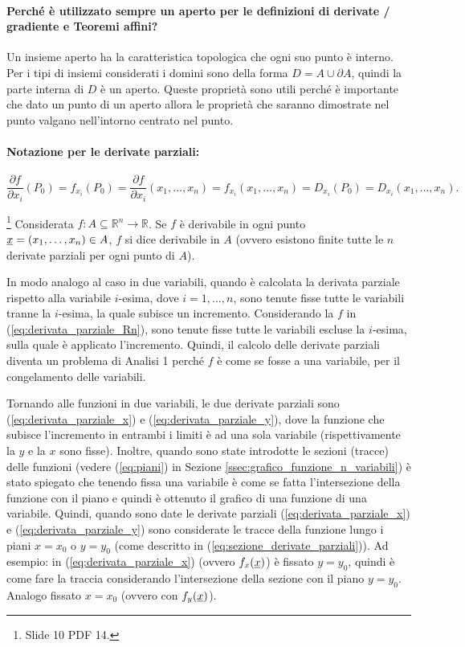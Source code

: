 \paragraph{Perché è utilizzato sempre un aperto per le definizioni di derivate / gradiente e Teoremi affini?} Un insieme aperto ha la caratteristica topologica che ogni suo punto è interno. Per i tipi di insiemi considerati i domini sono della forma $D=A\cup\partial A$, quindi la parte interna di $D$ è un aperto. Queste proprietà sono utili perché è importante che dato un punto di un aperto allora le proprietà che saranno dimostrate nel punto valgano nell'intorno centrato nel punto.

\paragraph{Notazione per le derivate parziali:}
\begin{equation*}
    \frac{\partial f}{\partial x_i}(P_0)=f_{x_i}(P_0)=\frac{\partial f}{\partial x_i}(x_1,\hdots,x_n)=f_{x_i}(x_1,\hdots,x_n)=  D_{x_i}(P_0)=D_{x_i}(x_1,\hdots,x_n).
\end{equation*}

\begin{definition}[Derivabilità in $A$]\footnote{Slide 10 PDF 14.}
   Considerata $f:A\subseteq\mathbb R^n\rightarrow\mathbb R$. Se $f$ è derivabile in ogni punto $\uline x=(x_1,\hdots,x_n)\in A$, $f$ si dice derivabile in $A$ (ovvero esistono finite tutte le $n$ derivate parziali per ogni punto di $A$).
\end{definition}

In modo analogo al caso in due variabili, quando è calcolata la derivata parziale rispetto alla variabile $i$-esima, dove $i=1,\hdots,n$, sono tenute fisse tutte le variabili tranne la $i$-esima, la quale subisce un incremento. Considerando la $f$ in (\ref{eq:derivata_parziale_Rn}), sono tenute fisse tutte le variabili escluse la $i$-esima, sulla quale è applicato l'incremento. Quindi, il calcolo delle derivate parziali diventa un problema di Analisi 1 perché $f$ è come se fosse a una variabile, per il congelamento delle variabili.

Tornando alle funzioni in due variabili, le due derivate parziali sono (\ref{eq:derivata_parziale_x}) e (\ref{eq:derivata_parziale_y}), dove la funzione che subisce l'incremento in entrambi i limiti è ad una sola variabile (rispettivamente la $y$ e la $x$ sono fisse). Inoltre, quando sono state introdotte le sezioni (tracce) delle funzioni (vedere (\ref{eq:piani}) in Sezione \ref{ssec:grafico_funzione_n_variabili}) è stato spiegato che tenendo fissa una variabile è come se fatta l'intersezione della funzione con il piano e quindi è ottenuto il grafico di una funzione di una variabile. Quindi, quando sono date le derivate parziali (\ref{eq:derivata_parziale_x}) e (\ref{eq:derivata_parziale_y}) sono considerate le tracce della funzione lungo i piani $x=x_0$ o $y=y_0$ (come descritto in (\ref{eq:sezione_derivate_parziali})). Ad esempio: in (\ref{eq:derivata_parziale_x}) (ovvero $f_x(\uline x)$) è fissato $y=y_0$, quindi è come fare la traccia considerando l'intersezione della sezione con il piano $y=y_0$. Analogo fissato $x=x_0$ (ovvero con $f_y(\uline x)$).

